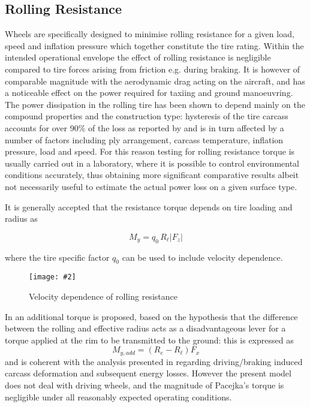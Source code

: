 \documentclass[12pt,a4paper]{report}
\newcommand{\figura}[5][htbp]{
\begin{figure}[#1]
\begin{center}
\texttt{[image: \#2]}
\caption{#4}\label{#5}
\end{center}
\end{figure}
}
\newcommand{\eq}[2]{
\begin{equation} \label{#1}
#2
\end{equation}
}
\begin{document}
\subsection{Rolling Resistance}
Wheels are specifically designed to minimise rolling resistance for a given load, speed and inflation pressure which together constitute the tire rating.
Within the intended operational envelope the effect of rolling resistance is negligible compared to tire forces arising from friction e.g. during braking. It is however of comparable magnitude with the aerodynamic drag acting on the aircraft, and has a noticeable effect on the power required for taxiing and ground manoeuvring.
The power dissipation in the rolling tire has been shown to depend mainly on the compound properties and the construction type: hysteresis of the tire carcass accounts for over 90\% of the loss as reported by \citep{williams} and is in turn affected by a number of factors including ply arrangement, carcass temperature, inflation pressure, load and speed. For this reason testing for rolling resistance torque is usually carried out in a laboratory, where it is possible to control environmental conditions accurately, thus obtaining more significant comparative results albeit not necessarily useful to estimate the actual power loss on a given surface type.

It is generally accepted \citep{wong01}  that the resistance torque depends on tire loading and radius as
\eq{eqn:rolres}{M_y = q_0 \,R_\ell |F_z|}
where the tire specific factor $q_0$ can be used to include velocity dependence.

\figura{piczero.jpg}{}{Velocity dependence of rolling resistance}{fig:rolrescurve}

In \citep{pacejka02} an additional torque is proposed, based on the hypothesis that the difference between the rolling and effective radius acts as a disadvantageous lever for a torque applied at the rim to be transmitted to the ground: this is expressed as
$$
M_{y,add} = (R_e-R_\ell)F_x
$$
and is coherent with the analysis presented in \citep{sven07}  regarding driving/braking induced carcass deformation and subsequent energy losses.
However the present model does not deal with driving wheels, and the magnitude of Pacejka's torque is negligible under all reasonably expected operating conditions.
\end{document}
